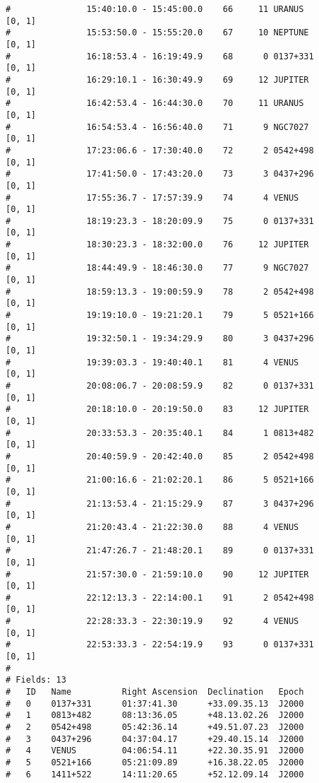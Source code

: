 \begin{verbatim}
#               15:40:10.0 - 15:45:00.0    66     11 URANUS         [0, 1]
#               15:53:50.0 - 15:55:20.0    67     10 NEPTUNE        [0, 1]
#               16:18:53.4 - 16:19:49.9    68      0 0137+331       [0, 1]
#               16:29:10.1 - 16:30:49.9    69     12 JUPITER        [0, 1]
#               16:42:53.4 - 16:44:30.0    70     11 URANUS         [0, 1]
#               16:54:53.4 - 16:56:40.0    71      9 NGC7027        [0, 1]
#               17:23:06.6 - 17:30:40.0    72      2 0542+498       [0, 1]
#               17:41:50.0 - 17:43:20.0    73      3 0437+296       [0, 1]
#               17:55:36.7 - 17:57:39.9    74      4 VENUS          [0, 1]
#               18:19:23.3 - 18:20:09.9    75      0 0137+331       [0, 1]
#               18:30:23.3 - 18:32:00.0    76     12 JUPITER        [0, 1]
#               18:44:49.9 - 18:46:30.0    77      9 NGC7027        [0, 1]
#               18:59:13.3 - 19:00:59.9    78      2 0542+498       [0, 1]
#               19:19:10.0 - 19:21:20.1    79      5 0521+166       [0, 1]
#               19:32:50.1 - 19:34:29.9    80      3 0437+296       [0, 1]
#               19:39:03.3 - 19:40:40.1    81      4 VENUS          [0, 1]
#               20:08:06.7 - 20:08:59.9    82      0 0137+331       [0, 1]
#               20:18:10.0 - 20:19:50.0    83     12 JUPITER        [0, 1]
#               20:33:53.3 - 20:35:40.1    84      1 0813+482       [0, 1]
#               20:40:59.9 - 20:42:40.0    85      2 0542+498       [0, 1]
#               21:00:16.6 - 21:02:20.1    86      5 0521+166       [0, 1]
#               21:13:53.4 - 21:15:29.9    87      3 0437+296       [0, 1]
#               21:20:43.4 - 21:22:30.0    88      4 VENUS          [0, 1]
#               21:47:26.7 - 21:48:20.1    89      0 0137+331       [0, 1]
#               21:57:30.0 - 21:59:10.0    90     12 JUPITER        [0, 1]
#               22:12:13.3 - 22:14:00.1    91      2 0542+498       [0, 1]
#               22:28:33.3 - 22:30:19.9    92      4 VENUS          [0, 1]
#               22:53:33.3 - 22:54:19.9    93      0 0137+331       [0, 1]
# 
# Fields: 13
#   ID   Name          Right Ascension  Declination   Epoch   
#   0    0137+331      01:37:41.30      +33.09.35.13  J2000   
#   1    0813+482      08:13:36.05      +48.13.02.26  J2000   
#   2    0542+498      05:42:36.14      +49.51.07.23  J2000   
#   3    0437+296      04:37:04.17      +29.40.15.14  J2000   
#   4    VENUS         04:06:54.11      +22.30.35.91  J2000   
#   5    0521+166      05:21:09.89      +16.38.22.05  J2000   
#   6    1411+522      14:11:20.65      +52.12.09.14  J2000   

\end{verbatim}
